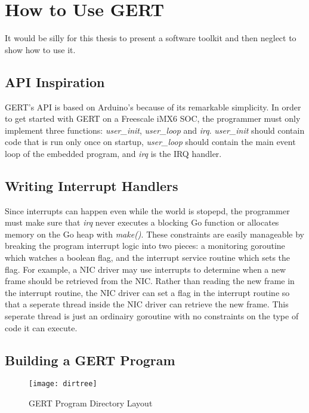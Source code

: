 \chapter{How to Use GERT}

It would be silly for this thesis to present a software toolkit and then
neglect to show how to use it.

\section{API Inspiration}
GERT's API is based on Arduino's because of its remarkable simplicity. In order to
get started with GERT on a Freescale iMX6 SOC, the programmer must only implement three functions: \textit{user\_init},
\textit{user\_loop} and \textit{irq}. \textit{user\_init} should contain code that is run only once
on startup, \textit{user\_loop} should contain the main event loop of the embedded program, and
\textit{irq} is the IRQ handler.

\section{Writing Interrupt Handlers}

Since interrupts can happen even while the world is stopepd, the programmer must make sure that \textit{irq} never executes
a blocking Go function or allocates memory on the Go heap with \textit{make()}. These constraints are
easily manageable by breaking the program interrupt logic into two pieces: a monitoring
goroutine which watches a boolean flag, and the interrupt service routine which sets the flag.
For example, a NIC driver may use interrupts to determine when a new frame should be retrieved
from the NIC. Rather than reading the new frame in the interrupt routine, the NIC driver
can set a flag in the interrupt routine so that a seperate thread inside the NIC driver can retrieve
the new frame. This seperate thread is just an ordinairy goroutine with no constraints on the type
of code it can execute.

\section{Building a GERT Program}

\begin{figure}[h]
\begin{center}
  \texttt{[image: dirtree]}
\end{center}
  \caption{GERT Program Directory Layout} \label{fig:dtree}
\end{figure}

